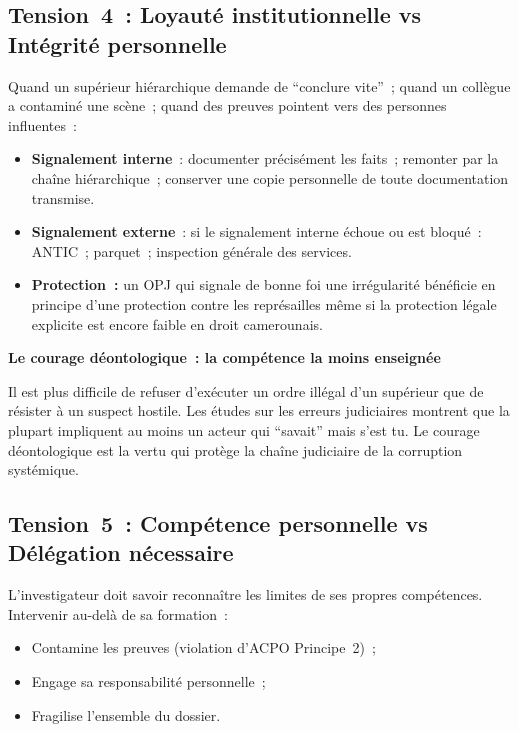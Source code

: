 \subsection{Tension~4~: Loyauté institutionnelle vs Intégrité personnelle}

Quand un supérieur hiérarchique demande de ``conclure vite''~; quand
un collègue a contaminé une scène~; quand des preuves pointent vers
des personnes influentes~:

\begin{itemize}
    \item \textbf{Signalement interne}~: documenter précisément les
          faits~; remonter par la chaîne hiérarchique~; conserver une
          copie personnelle de toute documentation transmise.
    \item \textbf{Signalement externe}~: si le signalement interne
          échoue ou est bloqué~: ANTIC~; parquet~; inspection générale
          des services.
    \item \textbf{Protection~:} un OPJ qui signale de bonne foi une
          irrégularité bénéficie en principe d'une protection contre
          les représailles même si la protection légale explicite
          est encore faible en droit camerounais.
\end{itemize}

\begin{boxalert}
\textbf{Le courage déontologique~: la compétence la moins enseignée}

Il est plus difficile de refuser d'exécuter un ordre illégal d'un
supérieur que de résister à un suspect hostile. Les études sur les
erreurs judiciaires montrent que la plupart impliquent au moins un
acteur qui ``savait'' mais s'est tu. Le courage déontologique est
la vertu qui protège la chaîne judiciaire de la corruption systémique.
\end{boxalert}

\subsection{Tension~5~: Compétence personnelle vs Délégation nécessaire}

L'investigateur doit savoir reconnaître les limites de ses propres
compétences. Intervenir au-delà de sa formation~:
\begin{itemize}
    \item Contamine les preuves (violation d'ACPO Principe~2)~;
    \item Engage sa responsabilité personnelle~;
    \item Fragilise l'ensemble du dossier.
\end{itemize}

